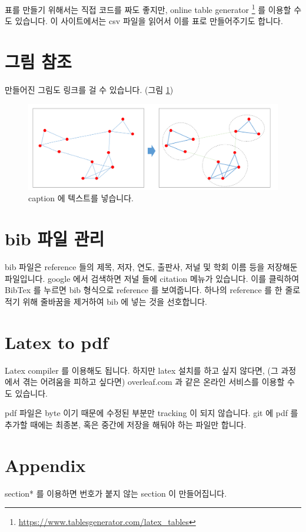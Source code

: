 \documentclass[11pt]{article}
\begin{document}
표를 만들기 위해서는 직접 코드를 짜도 좋지만, online table generator \footnote{\url{https://www.tablesgenerator.com/latex_tables}} 를 이용할 수도 있습니다. 
이 사이트에서는 csv 파일을 읽어서 이를 표로 만들어주기도 합니다.

\section{그림 참조}

만들어진 그림도 링크를 걸 수 있습니다. (그림 \ref{fig:community_detection})

\begin{figure}[ht]
\centering
\includegraphics[keepaspectratio=true, width=0.5\linewidth]{figures/community_detection.png}
\caption{caption 에 텍스트를 넣습니다.}
\label{fig:community_detection}
\end{figure}

\section{bib 파일 관리}

bib 파일은 reference 들의 제목, 저자, 연도, 출판사, 저널 및 학회 이름 등을 저장해둔 파일입니다.
google 에서 검색하면 저널 들에 citation 메뉴가 있습니다.
이를 클릭하여 BibTex 를 누르면 bib 형식으로 reference 를 보여줍니다.
하나의 reference 를 한 줄로 적기 위해 줄바꿈을 제거하여 bib 에 넣는 것을 선호합니다.

\section{Latex to pdf}

Latex compiler 를 이용해도 됩니다.
하지만 latex 설치를 하고 싶지 않다면, (그 과정에서 겪는 어려움을 피하고 싶다면) overleaf.com 과 같은 온라인 서비스를 이용할 수도 있습니다.

pdf 파일은 byte 이기 때문에 수정된 부분만 tracking 이 되지 않습니다.
git 에 pdf 를 추가할 때에는 최종본, 혹은 중간에 저장을 해둬야 하는 파일만 합니다.

%



\section*{Appendix}

section* 를 이용하면 번호가 붙지 않는 section 이 만들어집니다.
\end{document}
